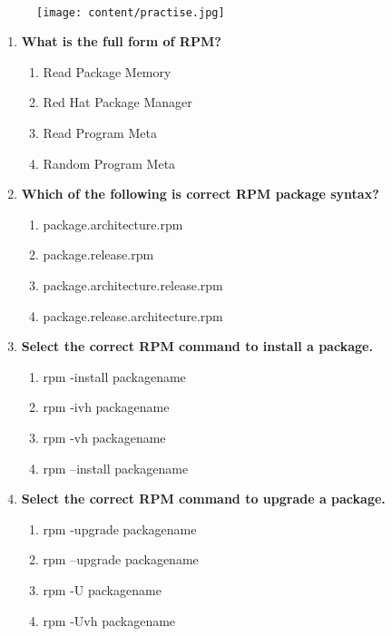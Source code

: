 \setlength{\columnsep}{3pt}
\begin{flushleft}
	
	\paragraph{}
	\bigskip
	
	\begin{figure}[h!]
		\centering
		\texttt{[image: content/practise.jpg]}
	\end{figure}	
	\begin{enumerate}
		
		\item \textbf{What is the full form of RPM?}
		\begin{enumerate}[label=(\alph*)]
			\item Read Package Memory
			\item Red Hat Package Manager %
			\item Read Program Meta
			\item Random Program Meta
		\end{enumerate}
		\bigskip
		\bigskip
		
		\item \textbf{Which of the following is correct RPM package syntax?}
		\begin{enumerate}[label=(\alph*)]
			\item package.architecture.rpm
			\item package.release.rpm
			\item package.architecture.release.rpm 
			\item package.release.architecture.rpm   %
		\end{enumerate}
		\bigskip
		\bigskip	
		
		\item \textbf{Select the correct RPM command to install a package.}
		\begin{enumerate}[label=(\alph*)]
			\item rpm -install packagename
			\item rpm -ivh packagename  %
			\item rpm -vh packagename
			\item rpm --install packagename
		\end{enumerate}
		\bigskip
		\bigskip	

		\item \textbf{Select the correct RPM command to upgrade a package.}
		\begin{enumerate}[label=(\alph*)]
			\item rpm -upgrade packagename
			\item rpm --upgrade packagename  
			\item rpm -U packagename  %
			\item rpm -Uvh packagename  %
		\end{enumerate}
		\bigskip
		\bigskip	


\end{enumerate}
\end{flushleft}
